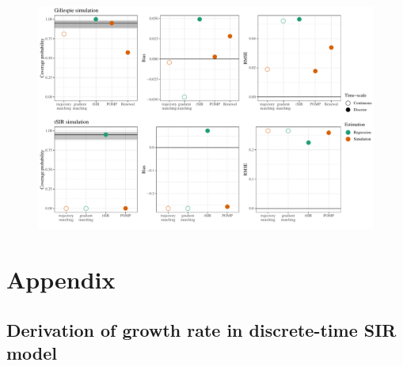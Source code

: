 \documentclass{article}
\begin{document}
\begin{figure}[t]
\includegraphics[width=\textwidth]{../figure/compare_estimate_sir.pdf}
\end{figure}





\pagebreak

\section{Appendix}

\subsection{Derivation of growth rate in discrete-time SIR model}
\end{document}
